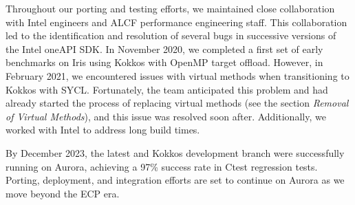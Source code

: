 Throughout our porting and testing efforts, we maintained close collaboration with Intel engineers and ALCF performance engineering staff. This collaboration led to the identification and resolution of several bugs in successive versions of the Intel oneAPI SDK. In November 2020, we completed a first set of early \vtkm benchmarks on Iris using Kokkos with OpenMP target offload. However, in February 2021, we encountered issues with virtual methods when transitioning to Kokkos with SYCL. Fortunately, the team anticipated this problem and had already started the process of replacing virtual methods (see the section {\it Removal of Virtual Methods}), and this issue was resolved soon after. Additionally, we worked with Intel to address long build times.

By December 2023, the latest \vtkm and Kokkos development branch were successfully running on Aurora, achieving a 97\% success rate in Ctest regression tests. Porting, deployment, and integration efforts are set to continue on Aurora as we move beyond the ECP era.
